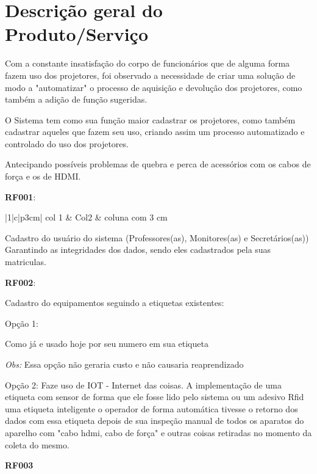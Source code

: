 \section{Descrição geral do Produto/Serviço}
\hspace{2.0cm}

Com a constante insatisfação do corpo de funcionários que de alguma forma fazem 
uso dos projetores, foi observado a necessidade de criar uma solução de modo 
a "automatizar" o processo de aquisição e devolução dos projetores, como também 
a adição de função sugeridas.  

O Sistema tem como sua função maior cadastrar os projetores, como também
cadastrar aqueles que fazem seu uso, criando assim um processo automatizado e
controlado do uso dos projetores. 

Antecipando possíveis problemas de quebra e perca de acessórios com os cabos de
força e os de HDMI. 

\hspace{1.0em}

\textbf{RF001}: 


  \begin{tabular}{|1|c|p{3cm}|}\hline
    col 1 & Col2 & coluna com 3 cm \\ \hline
  \end{tabular}

  Cadastro do usuário do sistema (Professores(as), Monitores(as) e Secretários(as))
  Garantindo as integridades dos dados, sendo eles cadastrados pela suas matriculas. 

  \textbf{RF002}:
  
  Cadastro do equipamentos seguindo a etiquetas existentes: 
  
  Opção 1: 
  
  Como já e usado hoje por seu numero em sua etiqueta
  
  \textit{Obs:} Essa opção não geraria custo e não causaria reaprendizado
 
  Opção 2:
  Faze uso de IOT - Internet das coisas. A implementação de uma etiqueta com sensor de forma que ele fosse lido pelo
  sistema ou um adesivo Rfid uma etiqueta inteligente o operador de forma automática tivesse o retorno dos dados com
  essa etiqueta depois de sua inspeção manual de todos os aparatos do aparelho com "cabo hdmi, cabo de força" e outras
  coisas retiradas no momento da coleta do mesmo. 

 
  \textbf{RF003}


